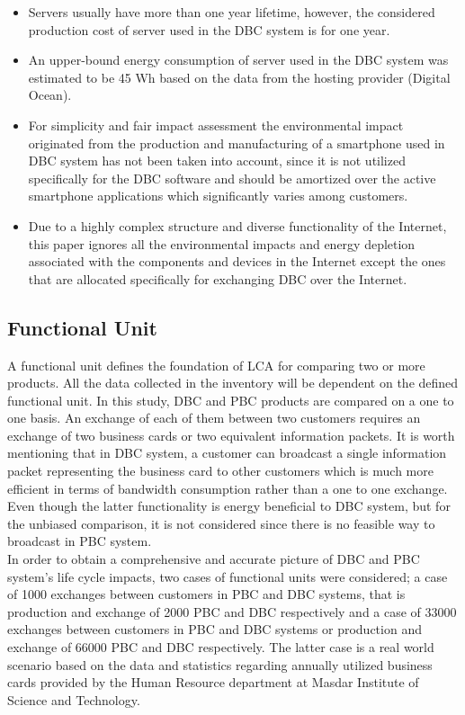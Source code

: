 \documentclass[3p,times,procedia]{elsarticle}
\begin{document}
\begin{itemize}[]
\item Servers usually have more than one year lifetime, however, the considered production cost of server used in the DBC system is for one year.
 \item An upper-bound energy consumption of server used in the DBC system was estimated to be 45 Wh based on the data from the hosting provider (Digital Ocean).
\item For simplicity and fair impact assessment the environmental impact originated from the production and manufacturing of a smartphone used in DBC system has not been taken into account, since it is not utilized specifically for the DBC software and should be amortized over the active smartphone applications which significantly varies among customers.
\item Due to a highly complex structure and diverse functionality of the Internet, this paper ignores all the environmental impacts and energy depletion associated with the components and devices in the Internet except the ones that are allocated specifically for exchanging DBC over the Internet.
\end{itemize}

\subsection{Functional Unit}\label{sec:FunctionalUnit}

A functional unit defines the foundation of LCA for comparing two or more products. All the data collected in the inventory will be dependent on the defined functional unit. In this study, DBC and PBC products are compared on a one to one basis. An exchange of each of them between two customers requires an exchange of two business cards or two equivalent information packets. It is worth mentioning that in DBC system, a customer can broadcast a single information packet representing the business card to other customers which is much more efficient in terms of bandwidth consumption rather than a one to one exchange. Even though the latter functionality is energy beneficial to DBC system, but for the unbiased comparison, it is not considered since there is no feasible way to broadcast in PBC system.\\

In order to obtain a comprehensive and accurate picture of DBC and PBC system's life cycle impacts, two cases of functional units were considered; a case of 1000 exchanges between customers in PBC and DBC systems, that is production and exchange of 2000 PBC and DBC respectively and a case of 33000 exchanges between customers in PBC and DBC systems or production and exchange of 66000 PBC and DBC respectively. The latter case is a real world scenario based on the data and statistics regarding annually utilized business cards provided by the Human Resource department at Masdar Institute of Science and Technology. 
\end{document}
